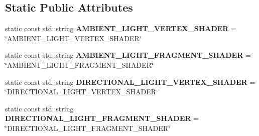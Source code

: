 \subsection*{Static Public Attributes}
\begin{DoxyCompactItemize}
\item 
\mbox{\label{struct_geometry_engine_1_1_geometry_world_item_1_1_geometry_light_1_1_light_shader_constants_a36bcb84cad37e176f5a93a6a116f113d}} 
static const std\+::string {\bfseries A\+M\+B\+I\+E\+N\+T\+\_\+\+L\+I\+G\+H\+T\+\_\+\+V\+E\+R\+T\+E\+X\+\_\+\+S\+H\+A\+D\+ER} = \char`\"{}A\+M\+B\+I\+E\+N\+T\+\_\+\+L\+I\+G\+H\+T\+\_\+\+V\+E\+R\+T\+E\+X\+\_\+\+S\+H\+A\+D\+ER\char`\"{}
\item 
\mbox{\label{struct_geometry_engine_1_1_geometry_world_item_1_1_geometry_light_1_1_light_shader_constants_a5c0d04533c87fb1a6b71f08db87a7de3}} 
static const std\+::string {\bfseries A\+M\+B\+I\+E\+N\+T\+\_\+\+L\+I\+G\+H\+T\+\_\+\+F\+R\+A\+G\+M\+E\+N\+T\+\_\+\+S\+H\+A\+D\+ER} = \char`\"{}A\+M\+B\+I\+E\+N\+T\+\_\+\+L\+I\+G\+H\+T\+\_\+\+F\+R\+A\+G\+M\+E\+N\+T\+\_\+\+S\+H\+A\+D\+ER\char`\"{}
\item 
\mbox{\label{struct_geometry_engine_1_1_geometry_world_item_1_1_geometry_light_1_1_light_shader_constants_a6625d921a5e4efae466e8c4ab3d0bee3}} 
static const std\+::string {\bfseries D\+I\+R\+E\+C\+T\+I\+O\+N\+A\+L\+\_\+\+L\+I\+G\+H\+T\+\_\+\+V\+E\+R\+T\+E\+X\+\_\+\+S\+H\+A\+D\+ER} = \char`\"{}D\+I\+R\+E\+C\+T\+I\+O\+N\+A\+L\+\_\+\+L\+I\+G\+H\+T\+\_\+\+V\+E\+R\+T\+E\+X\+\_\+\+S\+H\+A\+D\+ER\char`\"{}
\item 
\mbox{\label{struct_geometry_engine_1_1_geometry_world_item_1_1_geometry_light_1_1_light_shader_constants_a62d7104cd7668a2a95324eba945f13d9}} 
static const std\+::string {\bfseries D\+I\+R\+E\+C\+T\+I\+O\+N\+A\+L\+\_\+\+L\+I\+G\+H\+T\+\_\+\+F\+R\+A\+G\+M\+E\+N\+T\+\_\+\+S\+H\+A\+D\+ER} = \char`\"{}D\+I\+R\+E\+C\+T\+I\+O\+N\+A\+L\+\_\+\+L\+I\+G\+H\+T\+\_\+\+F\+R\+A\+G\+M\+E\+N\+T\+\_\+\+S\+H\+A\+D\+ER\char`\"{}
\item 

\end{DoxyCompactItemize}
